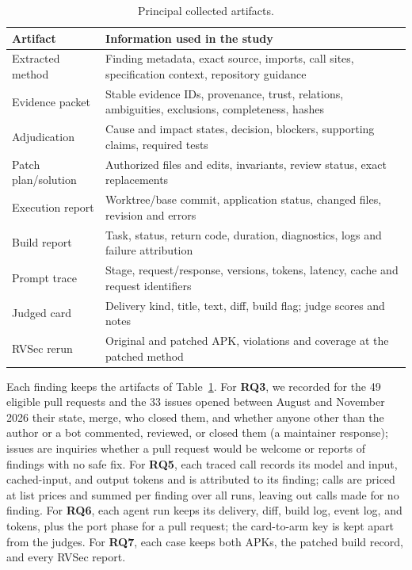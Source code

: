 \documentclass[conference]{IEEEtran}
\newcommand{\researchq}[1]{\textbf{RQ#1}}
\begin{document}
\begin{table}[H]
\centering
\caption{Principal collected artifacts.}
\label{tab:artifacts}
\footnotesize
\begin{tabular}{p{2.3cm}p{5.0cm}}
\toprule
Artifact & Information used in the study \\
\midrule
Extracted method & Finding metadata, exact source, imports, call sites,
specification context, repository guidance \\
Evidence packet & Stable evidence IDs, provenance, trust, relations,
ambiguities, exclusions, completeness, hashes \\
Adjudication & Cause and impact states, decision, blockers, supporting claims,
required tests \\
Patch plan/solution & Authorized files and edits, invariants, review status,
exact replacements \\
Execution report & Worktree/base commit, application status, changed files,
revision and errors \\
Build report & Task, status, return code, duration, diagnostics, logs and
failure attribution \\
Prompt trace & Stage, request/response, versions, tokens, latency, cache and
request identifiers \\
Judged card & Delivery kind, title, text, diff, build flag; judge scores and notes \\
RVSec rerun & Original and patched APK, violations and coverage at the patched method \\
\bottomrule
\end{tabular}
\end{table}

Each finding keeps the artifacts of Table~\ref{tab:artifacts}. For
\researchq{3}, we recorded for the 49 eligible pull requests and the 33 issues
opened between August and November 2026 their state, merge, who closed them,
and whether anyone other than the author or a bot commented, reviewed, or
closed them (a maintainer response); issues are inquiries whether a pull
request would be welcome or reports of findings with no safe fix. For
\researchq{5}, each traced call records its model and input, cached-input, and
output tokens and is attributed to its finding; calls are priced at list
prices and summed per finding over all runs, leaving out calls made for no
finding. For \researchq{6}, each agent run keeps its delivery, diff, build
log, event log, and tokens, plus the port phase for a pull request; the
card-to-arm key is kept apart from the judges. For \researchq{7}, each case
keeps both APKs, the patched build record, and every RVSec report.
\end{document}
